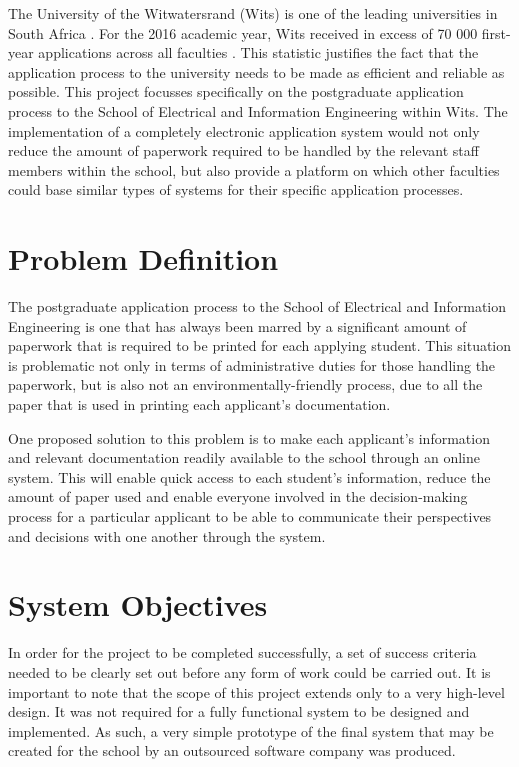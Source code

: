 \documentclass[journal]{IEEEtran}
\begin{document}
The University of the Witwatersrand (Wits) is one of the leading universities in South Africa \cite{topuniversity}. For the 2016 academic year, Wits received in excess of 70 000 first-year applications across all faculties \cite{witsapplicants}. This statistic justifies the fact that the application process to the university needs to be made as efficient and reliable as possible. This project focusses specifically on the postgraduate application process to the School of Electrical and Information Engineering within Wits. The implementation of a completely electronic application system would not only reduce the amount of paperwork required to be handled by the relevant staff members within the school, but also provide a platform on which other faculties could base similar types of systems for their specific application processes. 


\section{Problem Definition}

The postgraduate application process to the School of Electrical and Information Engineering is one that has always been marred by a significant amount of paperwork that is required to be printed for each applying student. This situation is problematic not only in terms of administrative duties for those handling the paperwork, but is also not an environmentally-friendly process, due to all the paper that is used in printing each applicant's documentation.

\hfill \break One proposed solution to this problem is to make each applicant's information and relevant documentation readily available to the school through an online system. This will enable quick access to each student's information, reduce the amount of paper used and enable everyone involved in the decision-making process for a particular applicant to be able to communicate their perspectives and decisions with one another through the system.


\section{System Objectives}

In order for the project to be completed successfully, a set of success criteria needed to be clearly set out before any form of work could be carried out. It is important to note that the scope of this project extends only to a very high-level design. It was not required for a fully functional system to be designed and implemented. As such, a very simple prototype of the final system that may be created for the school by an outsourced software company was produced.
\end{document}
